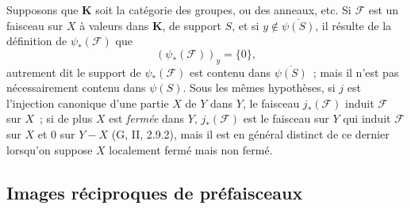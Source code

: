 \begin{env}[3.4.6]
\label{0.3.4.6-fr}
Supposons que $\mathbf{K}$ soit la catégorie des groupes, ou des anneaux, etc.
Si $\mathcal{F}$ est un faisceau sur $X$ à valeurs dans $\mathbf{K}$, de
support $S$, et si $y\notin\overline{\psi(S)}$, il résulte de la définition de
$\psi_*(\mathcal{F})$ que
\[
  (\psi_*(\mathcal{F}))_y=\{0\},
\]
autrement dit le support de $\psi_*(\mathcal{F})$ est contenu dans
$\overline{\psi(S)}$~; mais il n'est pas nécessairement contenu dans
$\psi(S)$. Sous les mêmes hypothèses, si $j$ est l'injection canonique d'une
partie $X$ de $Y$ dans $Y$, le faisceau $j_*(\mathcal{F})$ induit
$\mathcal{F}$ sur $X$~; si de plus $X$ est \emph{fermée} dans $Y$,
$j_*(\mathcal{F})$ est le faisceau sur $Y$ qui induit $\mathcal{F}$ sur $X$
et $0$ sur $Y-X$ (G, II, 2.9.2), mais il est en général distinct de ce dernier
lorsqu'on suppose $X$ localement fermé mais non fermé.
\end{env}
 
\subsection{Images réciproques de préfaisceaux}

